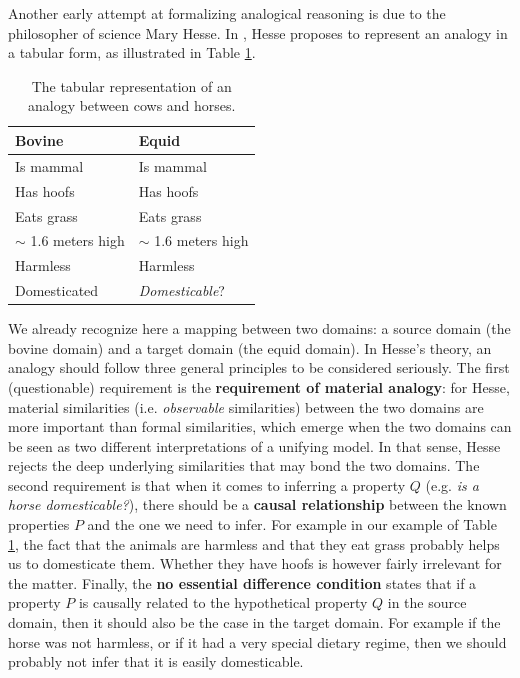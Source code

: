 Another early attempt at formalizing analogical reasoning is due to the
philosopher of science Mary Hesse. In \cite{Hes66}, Hesse proposes to represent
an analogy in a tabular form, as illustrated in Table \ref{TAB:Hesse_analogy}.
\begin{table}[t]
  \centering
  \begin{tabular}{ll}
    \toprule
    Bovine & Equid\\
    \midrule
    Is mammal & Is mammal\\
    Has hoofs & Has hoofs\\
    Eats grass & Eats grass\\
    $\sim$ 1.6 meters high & $\sim$ 1.6 meters high\\
    Harmless & Harmless\\
    Domesticated & \textit{Domesticable}?\\
    \bottomrule
  \end{tabular}
  \caption{The tabular representation of an analogy between cows and horses.}
  \label{TAB:Hesse_analogy}
\end{table}
We already recognize here a mapping between two domains: a source domain (the
bovine domain) and a target domain (the equid domain). In Hesse's theory, an
analogy should follow three general principles to be considered seriously. The
first (questionable) requirement is the \textbf{requirement of material
analogy}: for Hesse, material similarities (i.e. \textit{observable}
similarities) between the two domains are more important than formal
similarities, which emerge when the two domains can be seen as two different
interpretations of a unifying model. In that sense, Hesse rejects the deep
underlying similarities that may bond the two domains. The second requirement
is that when it comes to inferring a property $Q$ (e.g. \textit{is a horse
domesticable?}), there should be a \textbf{causal relationship} between the
known properties $P$ and the one we need to infer. For example in our example
of Table \ref{TAB:Hesse_analogy}, the fact that the animals are harmless
and that they eat grass probably helps us to domesticate them. Whether they
have hoofs is however fairly irrelevant for the matter. Finally, the \textbf{no
essential difference condition} states that if a property $P$ is causally
related to the hypothetical property $Q$ in the source domain, then it should
also be the case in the target domain. For example if the horse was not
harmless, or if it had a very special dietary regime, then we should probably
not infer that it is easily domesticable.


